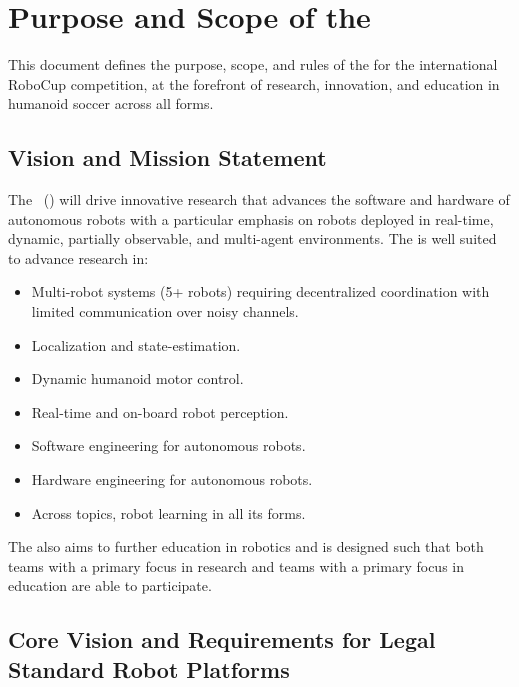 \section{Purpose and Scope of the \leaguename}
\label{sec:introduction}

This document defines the purpose, scope, and rules of the \leaguename for the international RoboCup competition, at the forefront of research, innovation, and education in humanoid soccer across all forms.

\subsection{Vision and Mission Statement}
\label{sec:vision_and_mission}

The \leaguename~(\leaguenameabbr) will drive innovative research that advances the software and hardware of autonomous robots with a particular emphasis on robots deployed in real-time, dynamic, partially observable, and multi-agent environments.
The \leaguenameabbr is well suited to advance research in:
\begin{itemize}
    \item Multi-robot systems (5+ robots) requiring decentralized coordination with limited communication over noisy channels.
    \item Localization and state-estimation.
    \item Dynamic humanoid motor control.
    \item Real-time and on-board robot perception.
    \item Software engineering for autonomous robots.
    \item Hardware engineering for autonomous robots.
    \item Across topics, robot learning in all its forms.
\end{itemize}

The \leaguenameabbr also aims to further education in robotics and is designed such that both teams with a primary focus in research and teams with a primary focus in education are able to participate.

\subsection{Core Vision and Requirements for Legal Standard Robot Platforms}

